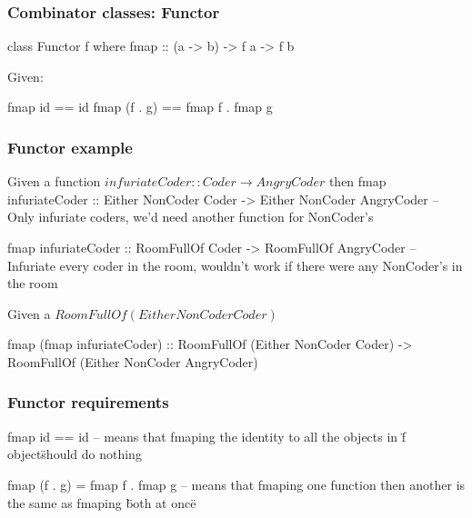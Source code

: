 \documentclass{beamer}
\begin{document}


\begin{frame}
\frametitle{Combinator classes: Functor}
class Functor f where
  fmap :: (a -> b) -> f a -> f b

  Given:

 fmap id == id
 fmap (f . g) == fmap f . fmap g
\end{frame}


%
%


\begin{frame}
\frametitle{Functor example}
Given a function $infuriateCoder :: Coder \to AngryCoder$ then
 fmap infuriateCoder :: Either NonCoder Coder -> Either NonCoder AngryCoder
 -- Only infuriate coders, we'd need another function for NonCoder's

 fmap infuriateCoder :: RoomFullOf Coder -> RoomFullOf AngryCoder
 -- Infuriate every coder in the room, wouldn't work if there were any NonCoder's in the room

Given a $RoomFullOf (Either NonCoder Coder)$

 fmap (fmap infuriateCoder) :: RoomFullOf (Either NonCoder Coder) -> RoomFullOf (Either NonCoder AngryCoder)

\end{frame}


\begin{frame}
\frametitle{Functor requirements}
 fmap id == id
 -- means that fmaping the identity to all the objects in \"f object\" should do nothing

 fmap (f . g) = fmap f . fmap g
 -- means that fmaping one function then another is the same as fmaping \"both at once\"

\end{frame}
\end{document}
